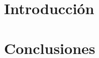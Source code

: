\documentclass[12pt]{article}
\begin{document}
    \section{Introducción}
    \newpage

    \tableofcontents
    \newpage

    \newpage

    \section{Conclusiones}
\end{document}
